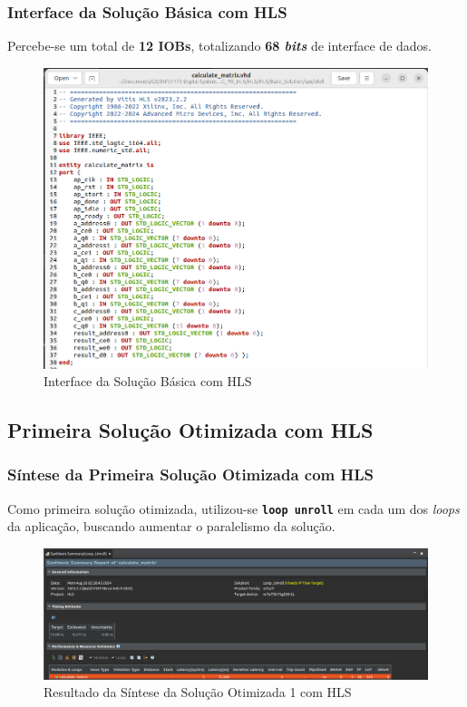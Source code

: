 \documentclass{beamer}
\begin{document}
    \begin{frame}
        \frametitle{Interface da Solução Básica com HLS}

        \begingroup {}
        Percebe-se um total de \textbf{12 IOBs}, totalizando
        \textbf{68 \textit{bits}} de interface de dados.
        \endgroup

        \begin{figure}[h] 
            \centering
            \includegraphics[width=0.62\linewidth]{./images/solutions/VHDL_-_Basic_Solution.png}
            \caption{\label{img:int-hls-basic-solution} Interface da Solução Básica com HLS}
          \end{figure}
    \end{frame}

    \subsection{Primeira Solução Otimizada com HLS}
    \begin{frame}
        \frametitle{Síntese da Primeira Solução Otimizada com HLS}

        \begingroup {}
        Como primeira solução otimizada, utilizou-se \textbf{\texttt{loop unroll}}
        em cada um dos \textit{loops} da aplicação, buscando aumentar o paralelismo
        da solução.
        \endgroup

        \begin{figure}[h] 
            \centering
            \includegraphics[width=1\linewidth]{./images/solutions/HLS_-_Loop_Unroll.png}
            \caption{\label{img:syn-hls-optimized-solution-1} Resultado da Síntese da Solução Otimizada 1 com HLS}
          \end{figure}
    \end{frame}
\end{document}
